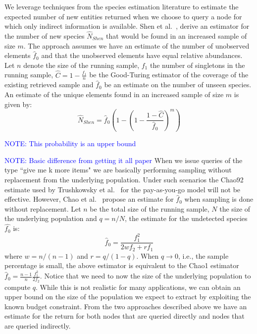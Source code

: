 \documentclass{vldb}
\newcommand{\note}[1]{\textcolor{blue}{{#1}}}
\begin{document}
We leverage techniques from the species estimation literature to estimate the expected number of new entities returned when we choose to query a node for which only indirect information is available. Shen et al.~\cite{shen:2003}, derive an estimator for the number of new species $\hat{N}_{Shen}$ that would be found in an increased sample of size $m$. The approach assumes we have an estimate of the number of unobserved elements $\hat{f}_0$ and that the unobserved elements have equal relative abundances. Let $n$ denote the size of the running sample, $f_1$ the number of singletons in the running sample, $\hat{C} = 1 - \frac{f_1}{n}$ be the Good-Turing estimator of the coverage of the existing retrieved sample and $\hat{f}_0$ be an estimate on the number of unseen species.  An estimate of the unique elements found in an increased sample of size $m$ is given by:
\begin{equation}
\hat{N}_{Shen} = \hat{f}_0 \left( 1 - \left(1 - \frac{1 - \hat{C}}{\hat{f}_0}\right)^m\right)
\end{equation}

\note{NOTE: This probability is an upper bound}

\note{NOTE: Basic difference from getting it all paper} When we issue queries of the type ``give me k more items" we are basically performing sampling without replacement from the underlying population. Under such scenarios the Chao92 estimate used by Trushkowsky et al.~\cite{trushkowsky:2013} for the pay-as-you-go model will not be effective. However, Chao et al.~\cite{chao:2012} propose an estimate for $\hat{f}_0$ when sampling is done without replacement. Let $n$ be the total size of the running sample, $N$ the size of the underlying population and $q = n/N$, the estimate for the undetected species $\hat{f_0}$ is:
\begin{equation}
\hat{f}_0 = \frac{f_1^2}{2wf_2 + rf_1}
\end{equation}
where $w = n/(n-1)$ and $r = q/(1-q)$.
When $q \rightarrow 0$, i.e., the sample percentage is small, the above estimator is equivalent to the Chao1 estimator $\hat{f}_0 = \frac{n-1}{n} \frac{f_1^2}{2f_2}$.
Notice that we need to now the size of the underlying population to compute $q$. While this is not realistic for many applications, we can obtain an upper bound on the size of the population we expect to extract by exploiting the known budget constraint. From the two approaches described above we have an estimate for the return for both nodes that are queried directly and nodes that are queried indirectly. 
\end{document}
